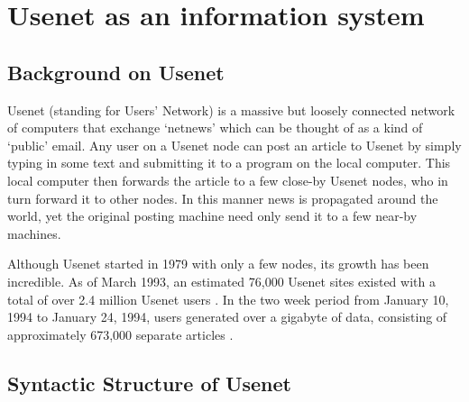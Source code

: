 
\section{Usenet as an information system}
\label{sec:usenet}


\subsection{Background on Usenet}

Usenet (standing for Users' Network) is a massive but loosely connected
network of computers that exchange `netnews' which can be thought of as a
kind of `public' email. Any user on a Usenet node can post an article to
Usenet by simply typing in some text and submitting it to a program on the
local computer. This local computer then forwards the article to a few
close-by Usenet nodes, who in turn forward it to other nodes. In this
manner news is propagated around the world, yet the original posting
machine need only send it to a few near-by machines.

Although Usenet started in 1979 with only a few nodes, its growth has been
incredible.  As of March 1993, an estimated 76,000 Usenet sites existed with a
total of over 2.4 million Usenet users \cite{reid-usenet-93}. In the two week
period from January 10, 1994 to January 24, 1994, users generated over a
gigabyte of data, consisting of approximately 673,000 separate articles
\cite{uunet-usenet-94}.

\subsection{Syntactic Structure of Usenet}

